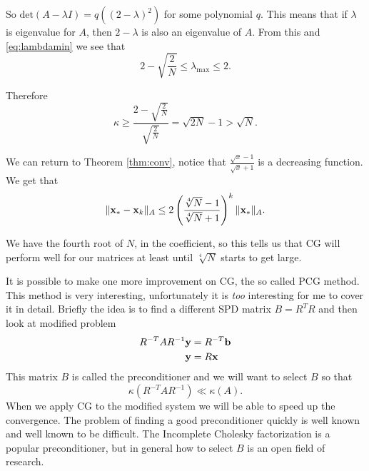 \documentclass{article}
\newcommand{\bx}{{\bf x}}
\newcommand{\bb}{{\bf b}}
\newcommand{\by}{{\bf y}}
\newcommand{\beq}{\begin{equation}}
\newcommand{\eeq}{\end{equation}}
\theoremstyle{remark}
\begin{document}
So $\text{det}(A-\lambda I) = q((2-\lambda)^2)$ for some polynomial $q$. This means that if $\lambda$ is eigenvalue for $A$, then $2-\lambda$ is also an eigenvalue of $A$. From this and \eqref{eq:lambdamin} we see that 
\beq
\label{eq:lambdamax}
2 - \sqrt{\frac{2}{N}} \leq \lambda_{\max} \leq 2. 
\eeq

Therefore 
\beq
\kappa \geq \frac{2 - \sqrt{\frac{2}{N}}}{\sqrt{\frac{2}{N}}} = \sqrt{2 N} -1 >\sqrt{N} .
\eeq

We can return to Theorem \ref{thm:conv}, notice that $\frac{\sqrt{x}-1}{\sqrt{x}+1}$ is a decreasing function. We get that 
\beq
\|\bx_* - \bx_k \|_A \leq 2 \left(\frac{\sqrt[4]{N}-1}{\sqrt[4]{N}+1} \right)^k \|\bx_*\|_A.
\eeq

We have the fourth root of $N$, in the coefficient, so this tells us that CG will perform well for our matrices at least until $\sqrt[4]{N}$ starts to get large.

It is possible to make one more improvement on CG, the so called PCG method. This method is very interesting, unfortunately it is \textit{too} interesting for me to cover it in detail. Briefly the idea is to find a different SPD matrix $B = R^TR$ and then look at modified problem 
\begin{align}
\label{eq:precon}
R^{-T}AR^{-1}\by &= R^{-T}\bb\\ \nonumber
\by &= R\bx
\end{align}
This matrix $B$ is called the preconditioner and we will want to select $B$ so that 
\beq
\kappa(R^{-T} A R^{-1}) \ll \kappa(A).
\eeq
When we apply CG to the modified system we will be able to speed up the convergence. The problem of finding a good preconditioner quickly is well known and well known to be difficult. The Incomplete Cholesky factorization is a popular preconditioner, but in general how to select $B$ is an open field of research. 

\printbibliography
\end{document}
